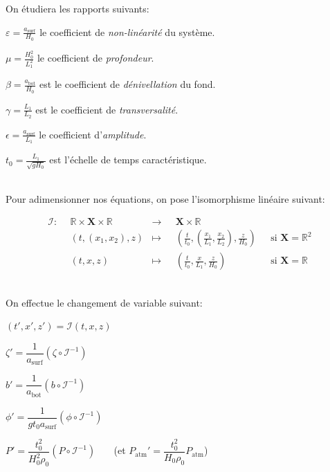\documentclass[12pt,a4paper]{article}
\numberwithin{equation}{section}
\begin{document}
On étudiera les rapports suivants:

\begin{list}{\textbullet}{}
    \item $\varepsilon = \frac{a_{\text{surf}}}{H_0}$ le coefficient de \textit{non-linéarité} du système.
    \item $\mu =\frac{H_0^2}{L_1^2}$ le coefficient de \textit{profondeur}.
    \item $\beta = \frac{a_{\text{bot}}}{H_0}$ est le coefficient de \textit{dénivellation} du fond.
    \item $\gamma = \frac{L_1}{L_2}$ est le coefficient de \textit{transversalité}.
    \item $\epsilon = \frac{ a_{\text{surf}}}{L_1}$ le coefficient d'\textit{amplitude}.
    \item $t_0 = \frac{L_1}{\sqrt{gH_0}}$ est l'échelle de temps caractéristique.
\end{list}

~\\
Pour adimensionner nos équations, on pose l'isomorphisme linéaire suivant:

  
\begin{equation}
\begin{aligned}
      \mathcal{I}:~~&\mathbb{R}\times\textbf{X}\times\mathbb{R} &\longrightarrow ~~~ &\textbf{X}\times \mathbb{R} & \\
      &(t,(x_1,x_2),z) &\longmapsto &\left(\frac{t}{t_0},\left(\frac{x_1}{L_1},\frac{x_2}{L_2} \right),\frac{z}{H_0}\right) ~~~&\text{si }\textbf{X}=\mathbb{R}^2\\
      &(t, x ,z) &\longmapsto &\left(\frac{t}{t_0},\frac{x}{L_1},\frac{z}{H_0}\right) ~~~&\text{si }   \textbf{X}=\mathbb{R}
\end{aligned}
\end{equation}

    
   
    


~\\

On effectue le changement de variable suivant:

\begin{list}{\textbullet}{}
    \item $(t',x',z') = \mathcal{I} (t,x,z)$
    \item $\zeta' = \dfrac{1}{a_{\text{surf}}}(\zeta \circ \mathcal{I}^{-1})$ 
    \item $b' = \dfrac{1}{a_{\text{bot}}}(b\circ\mathcal{I}^{-1})$
     \item $\phi' = \dfrac{1}{g t_0 a_{\text{surf}}}(\phi \circ \mathcal{I}^{-1})$
     \item $P' = \dfrac{t_0^2}{H_0^2\rho_0} (P \circ \mathcal{I}^{-1})~~~~~~~$   (et $P_{\text{atm}}' = \dfrac{t_0^2}{H_0\rho_0} P_\text{atm}$)
\end{list}
\end{document}
